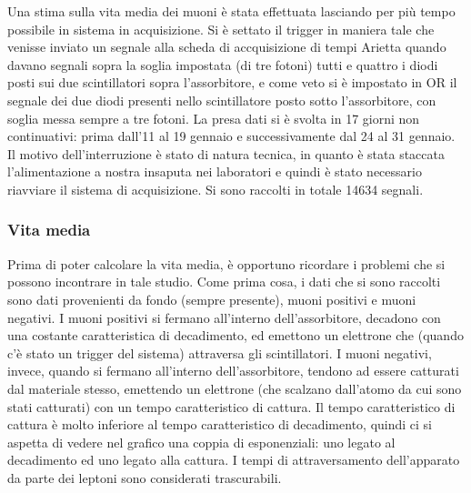 Una stima sulla vita media dei muoni è stata effettuata lasciando per più tempo possibile in sistema in acquisizione. 
Si è settato il trigger in maniera tale che venisse inviato un segnale alla scheda di accquisizione di tempi Arietta quando davano segnali sopra la soglia  impostata (di tre fotoni) tutti e quattro i diodi posti sui due scintillatori sopra l'assorbitore, e come veto si è impostato in OR il segnale dei due diodi presenti nello scintillatore posto sotto l'assorbitore, con soglia messa sempre a tre fotoni. 
La presa dati si è svolta in 17 giorni non continuativi: prima dall'11 al 19 gennaio e successivamente dal 24 al 31 gennaio. 
Il motivo dell'interruzione è stato di natura tecnica, in quanto è stata staccata l'alimentazione a nostra insaputa nei laboratori e quindi è stato necessario riavviare il sistema di acquisizione. Si sono raccolti in totale 14634 segnali.

\subsubsection{Vita media}
Prima di poter calcolare la vita  media, è opportuno ricordare i problemi che si possono incontrare in tale studio. 
Come prima cosa, i dati che si sono raccolti sono dati provenienti da fondo (sempre presente),  muoni positivi e muoni negativi. 
I muoni positivi si fermano all'interno dell'assorbitore, decadono con una costante caratteristica di decadimento, ed emettono un elettrone che (quando c'è stato un  trigger del sistema) attraversa gli scintillatori. 
I muoni negativi, invece, quando si fermano all'interno dell'assorbitore, tendono ad essere catturati dal materiale stesso, emettendo un elettrone (che scalzano dall'atomo da cui sono stati catturati) con un tempo caratteristico di cattura. 
Il tempo caratteristico di cattura è molto inferiore al tempo caratteristico di decadimento, quindi ci si aspetta di vedere nel grafico una coppia di esponenziali: uno legato al decadimento ed uno legato alla cattura. 
I tempi di attraversamento dell'apparato da parte dei leptoni sono considerati trascurabili.\\

